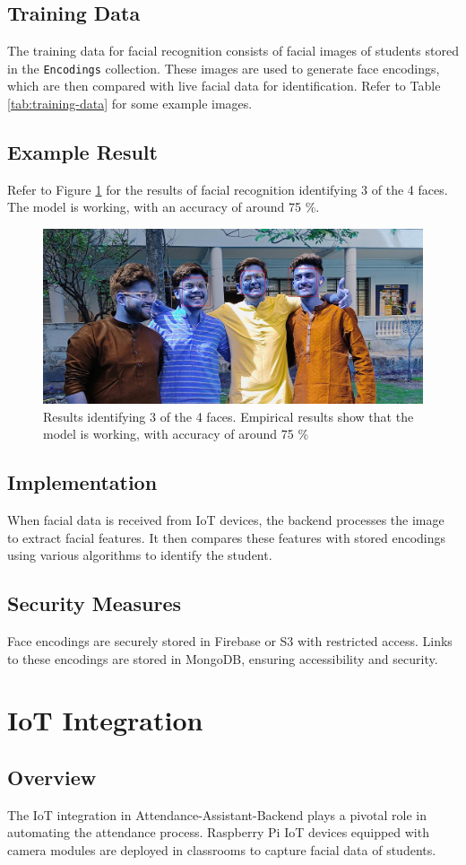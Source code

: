 \documentclass[conference]{IEEEtran}
\begin{document}
\subsection{Training Data}
The training data for facial recognition consists of facial images of students stored in the \texttt{Encodings} collection. These images are used to generate face encodings, which are then compared with live facial data for identification. Refer to Table \ref{tab:training-data} for some example images.

\subsection{Example Result}
Refer to Figure \ref{fig:face-rec-results} for the results of facial recognition identifying 3 of the 4 faces. The model is working, with an accuracy of around 75 \%.
\begin{figure}
    \centering
    \includegraphics[width=.45\textwidth]{face rec results cropped.jpg}
    \caption{Results identifying 3 of the 4 faces. Empirical results show that the model is working, with accuracy of around 75 \%}
    \label{fig:face-rec-results}
\end{figure}
\subsection{Implementation}
When facial data is received from IoT devices, the backend processes the image to extract facial features. It then compares these features with stored encodings using various algorithms to identify the student.

\subsection{Security Measures}
Face encodings are securely stored in Firebase or S3 with restricted access. Links to these encodings are stored in MongoDB, ensuring accessibility and security.

\section{IoT Integration}
\subsection{Overview}
The IoT integration in Attendance-Assistant-Backend plays a pivotal role in automating the attendance process. Raspberry Pi IoT devices equipped with camera modules are deployed in classrooms to capture facial data of students.
\end{document}
